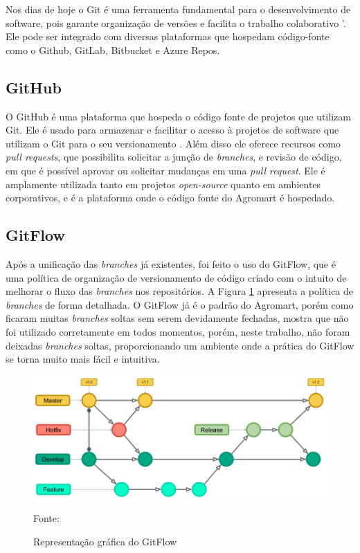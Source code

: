 Nos dias de hoje o Git é uma ferramenta fundamental para o desenvolvimento de software, pois garante organização de versões e facilita o trabalho colaborativo  '. Ele pode ser integrado com diversas plataformas que hospedam código-fonte como o Github, GitLab, Bitbucket e Azure Repos. 

\subsection{GitHub}
O GitHub é uma plataforma que hospeda o código fonte de projetos que utilizam Git. Ele é usado para armazenar e facilitar o acesso à projetos de software que utilizam o Git para o seu versionamento \cite{github2024}. Além disso ele oferece recursos como \textit{pull requests}, que possibilita solicitar a junção de \textit{branches}, e revisão de código, em que é possível aprovar ou solicitar mudanças em uma \textit{pull request}. Ele é amplamente utilizada tanto em projetos \textit{open-source} quanto em ambientes corporativos, e é a plataforma onde o código fonte do Agromart é hospedado.

\subsection{GitFlow}

Após a unificação das \textit{branches} já existentes, foi feito o uso do GitFlow, que é uma política de organização de versionamento de código criado com o intuito de melhorar o fluxo das \textit{branches} nos repositórios. A Figura \ref{gitflow} apresenta a política de \textit{branches} de forma detalhada. O GitFlow já é o padrão do Agromart, porém como ficaram muitas \textit{branches} soltas sem serem devidamente fechadas, mostra que não foi utilizado corretamente em todos momentos, porém, neste trabalho, não foram deixadas \textit{branches} soltas, proporcionando um ambiente onde a prática do GitFlow se torna muito mais fácil e intuitiva.

\begin{figure}[h]
	\centering
	\includegraphics[keepaspectratio=true,scale=0.5]{figuras/gitflow.png}
	\caption{Representação gráfica do GitFlow}
    Fonte: \cite{alura2023}
	\label{gitflow}
\end{figure}


